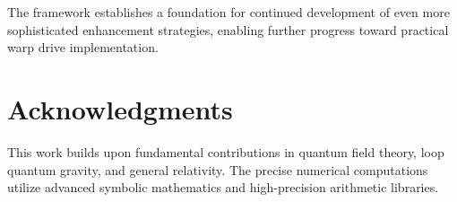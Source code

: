 \documentclass[12pt,a4paper]{article}
\begin{document}
The framework establishes a foundation for continued development of even more sophisticated enhancement strategies, enabling further progress toward practical warp drive implementation.

\section*{Acknowledgments}

This work builds upon fundamental contributions in quantum field theory, loop quantum gravity, and general relativity. The precise numerical computations utilize advanced symbolic mathematics and high-precision arithmetic libraries.
\end{document}
